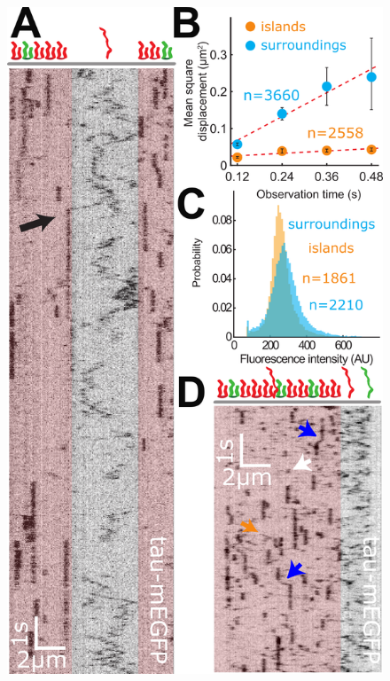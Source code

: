\begin{figure}
	\centering
	\includegraphics[width=1\linewidth]{Figures/tau_singleMolecules.png}
	\caption[Tau molecules are stationary within the islands.]{
}
\end{figure}
